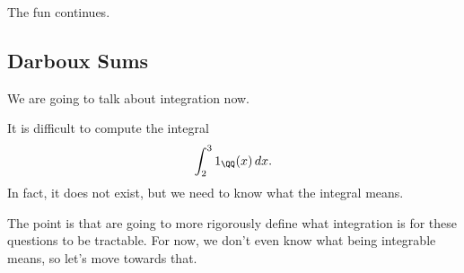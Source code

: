 \documentclass[../notes.tex]{subfiles}
\begin{document}














The fun continues.

\subsection{Darboux Sums}
We are going to talk about integration now.
\begin{example}
	It is difficult to compute the integral
	\[\int_2^31_{\QQ}(x)\,dx.\]
	In fact, it does not exist, but we need to know what the integral means.
\end{example}
The point is that are going to more rigorously define what integration is for these questions to be tractable. For now, we don't even know what being integrable means, so let's move towards that.
\end{document}
